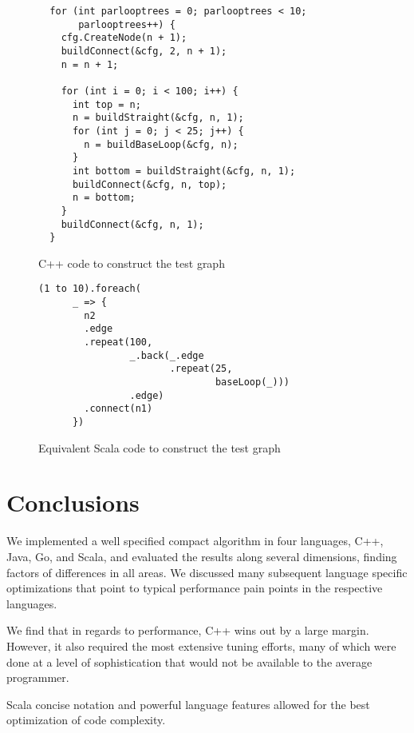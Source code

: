 \begin{figure}
\begin{footnotesize}
\begin{verbatim}
  for (int parlooptrees = 0; parlooptrees < 10; 
       parlooptrees++) {
    cfg.CreateNode(n + 1);
    buildConnect(&cfg, 2, n + 1);
    n = n + 1;

    for (int i = 0; i < 100; i++) {
      int top = n;
      n = buildStraight(&cfg, n, 1);
      for (int j = 0; j < 25; j++) {
        n = buildBaseLoop(&cfg, n);
      }
      int bottom = buildStraight(&cfg, n, 1);
      buildConnect(&cfg, n, top);
      n = bottom;
    }
    buildConnect(&cfg, n, 1);
  }
\end{verbatim}
\end{footnotesize}
\caption{C++ code to construct the test graph}
\label{cpp-graph}
\end{figure}

\begin{figure}
\begin{footnotesize}
\begin{verbatim}
(1 to 10).foreach(
      _ => {
        n2
        .edge
        .repeat(100,
                _.back(_.edge
                       .repeat(25,
                               baseLoop(_)))
                .edge)
        .connect(n1)
      })
\end{verbatim}
\end{footnotesize}
\caption{Equivalent Scala code to construct the test graph}
\label{scala-graph}
\end{figure}


\section{Conclusions}

We implemented a well specified compact algorithm in four languages,
C++, Java, Go, and Scala, and evaluated the results along several
dimensions, finding factors of differences in all areas.
We discussed many subsequent language specific
optimizations that point to typical performance pain points in the
respective languages.

We find that in regards to performance, C++ wins out by a 
large margin. However, it also required the most extensive
tuning efforts, many of which were done at a level of
sophistication that would not be available to the average
programmer. 

Scala concise notation and powerful language features
allowed for the best optimization of code complexity.

